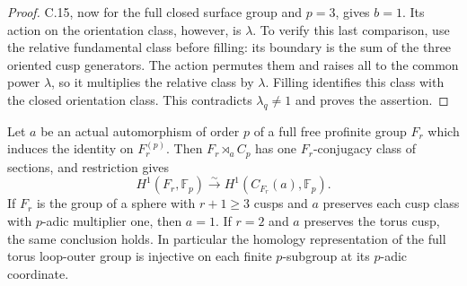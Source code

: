 \begin{proof}
C.15, now for the full closed surface group and $p=3$,
gives $b=1$.  Its action on the orientation class,
however, is $\lambda$.  To verify this last comparison,
use the relative fundamental class before filling:
its boundary is the sum of the three oriented cusp
generators.  The action permutes them and raises all
to the common power $\lambda$, so it multiplies the
relative class by $\lambda$.  Filling identifies this
class with the closed orientation class.  This
contradicts $\lambda_q\ne1$ and proves the assertion.
\end{proof}

Let $a$ be an actual automorphism of order $p$ of a full
free profinite group $F_r$ which induces the identity on
$F_r^{(p)}$.  Then $F_r\rtimes_a C_p$ has one
$F_r$-conjugacy class of sections, and restriction gives
\[
 H^1(F_r,\mathbb F_p)\xrightarrow{\sim}
 H^1(C_{F_r}(a),\mathbb F_p).                              \tag{C.17.1}
\]
If $F_r$ is the group of a sphere with $r+1\geq3$ cusps
and $a$ preserves each cusp class with $p$-adic multiplier
one, then $a=1$.  If $r=2$ and $a$ preserves the torus
cusp, the same conclusion holds.  In particular the
homology representation of the full torus loop-outer
group is injective on each finite $p$-subgroup at its
$p$-adic coordinate.

